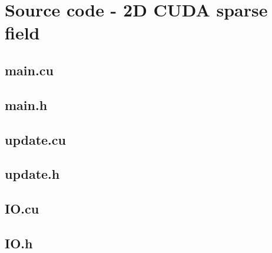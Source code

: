 \section*{Source code - 2D CUDA sparse field}
\subsection*{main.cu}
\subsection*{main.h}

\subsection*{update.cu}

\subsection*{update.h}

\subsection*{IO.cu}

\subsection*{IO.h}

\clearpage